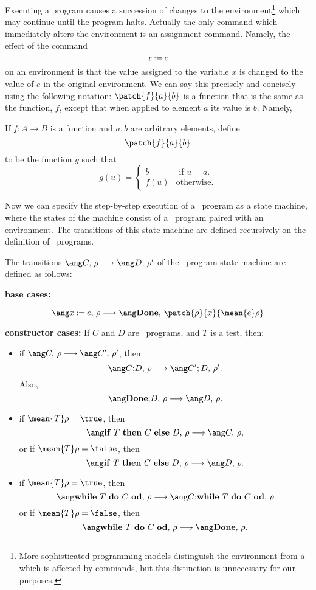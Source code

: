 \iffalse
(A variable is a special case of an expression, so $\mean{x}\rho \eqdef \rho(x)$.)
\fi

Executing a program causes a succession of changes to the
environment\footnote{More sophisticated programming models distinguish
the environment from a  which is affected by commands, but
this distinction is unnecessary for our purposes.}  which may continue
until the program halts.  Actually the only command which immediately
alters the environment is an assignment command.  Namely, the effect
of the command
\[
x \mathbin{\mathtt{:=}} e
\]
on an environment is that the value assigned to the variable $x$ is
changed to the value of $e$ in the original environment.  We can say
this precisely and concisely using the following notation:
$\patch{f}{a}{b}$ is a function that is the same as the function, $f$,
except that when applied to element $a$ its value is $b$.  Namely,
\begin{definition}
If $f:A \to B$ is a function and $a,b$ are arbitrary elements, define
  \[
\patch{f}{a}{b}
\]
to be the function $g$ such that
\begin{equation*}
g(u) = \begin{cases}
         b & \text{ if } u = a.\\
         f(u) & \text{otherwise.}
       \end{cases}
\end{equation*}
\end{definition}

Now we can specify the step-by-step execution of a \while\ program as a state
machine, where the states of the machine consist of a \while\ program paired with an
environment.  The transitions of this state machine are defined
recursively on the definition of \while\ programs.

\begin{definition}

The transitions $\step{C}{\rho}{D}{\rho'}$ of the \while\ program state machine are
defined as follows:

\textbf{base cases:}

\[
\step{x \assigned e}{\rho}{\halt}{\patch{\rho}{x}{\mean{e}\rho}}
\]

\textbf{constructor cases:}
If $C$ and $D$ are \while\ programs, and $T$ is a test, then:

\begin{itemize}

\item if $\step{C}{\rho}{C'}{\rho'}$, then
\[
\step{\seqcomm{C}{D}}{\rho}{C';D}{\rho'}.
\]
Also,
\[
\step{\seqcomm{\halt}{D}}{\rho}{D}{\rho}.
\]

\item if $\mean{T}\rho = \true$, then
\[
\step{\condcomm{T}{C}{D}}{\rho}{C}{\rho},
\]
or if $\mean{T}\rho = \false$, then
\[
\step{\condcomm{T}{C}{D}}{\rho}{D}{\rho}.
\]

\item if $\mean{T}\rho = \true$, then
\[
\step{\wloop{T}{C}}{\rho}{\seqcomm{C}{\wloop{T}{C}}}{\rho}
\]
or if $\mean{T}\rho = \false$, then
\[
\step{\wloop{T}{C}}{\rho}{\halt}{\rho}.
\]
\end{itemize}
\end{definition}


